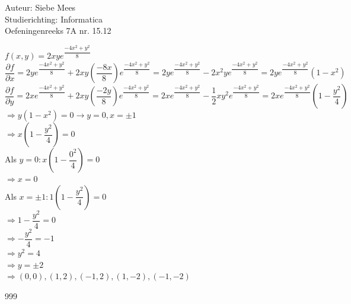 \documentclass[a4paper]{article}
\begin{document}
  
\noindent \large Auteur: Siebe Mees \\
\noindent \large Studierichting: Informatica\\
\noindent \large Oefeningenreeks 7A nr. 15.12\\

\medskip

\normalsize

$f(x,y)=2xye^{\dfrac{-4x^2+y^2}{8}}$\\

$\dfrac{\partial f}{\partial x}=2ye^{\dfrac{-4x^2+y^2}{8}}+2xy\left(\dfrac{-8x}{8}\right)e^{\dfrac{-4x^2+y^2}{8}}=2ye^{\dfrac{-4x^2+y^2}{8}}-2x^2ye^{\dfrac{-4x^2+y^2}{8}}=2ye^{\dfrac{-4x^2+y^2}{8}}(1-x^2)$\\

$\dfrac{\partial f}{\partial y}=2xe^{\dfrac{-4x^2+y^2}{8}}+2xy\left(\dfrac{-2y}{8}\right)e^{\dfrac{-4x^2+y^2}{8}}=2xe^{\dfrac{-4x^2+y^2}{8}}-\dfrac{1}{2}xy^2e^{\dfrac{-4x^2+y^2}{8}}=2xe^{\dfrac{-4x^2+y^2}{8}}\left(1-\dfrac{y^2}{4}\right)$\\

$\Rightarrow y(1-x^2)=0 \rightarrow y=0, x=\pm1$\\

$\Rightarrow x\left(1-\dfrac{y^2}{4}\right)=0$\\

Als $ y=0 : x\left(1-\dfrac{0^2}{4}\right)=0$\\

$\Rightarrow x=0$\\

Als $ x=\pm1 : 1\left(1-\dfrac{y^2}{4}\right)=0$\\

$\Rightarrow 1-\dfrac{y^2}{4}=0$\\

$\Rightarrow -\dfrac{y^2}{4}=-1$\\

$\Rightarrow y^2=4$\\

$\Rightarrow y=\pm2$\\

$\Rightarrow (0,0),(1,2),(-1,2),(1,-2),(-1,-2)$\\


\begin{thebibliography}{999}
\end{thebibliography}
\end{document}

